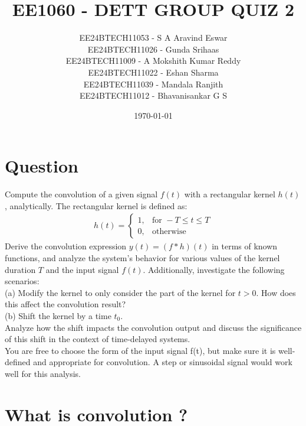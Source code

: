 \documentclass[12pt]{article}
\title{\textbf{EE1060 - DETT GROUP QUIZ 2}}
\author{EE24BTECH11053 - S A Aravind Eswar \\ EE24BTECH11026 - Gunda Srihaas \\ EE24BTECH11009 - A Mokshith Kumar Reddy \\ EE24BTECH11022 - Eshan Sharma \\ EE24BTECH11039 - Mandala Ranjith \\ EE24BTECH11012 - Bhavanisankar G S}
\date{\today}
\begin{document}
\maketitle
\thispagestyle{empty} %

\newpage
\tableofcontents
\newpage


\section{\textbf{Question}}

Compute the convolution of a given signal $f(t)$ with a rectangular kernel $h(t)$, analytically. The rectangular kernel
is defined as:
\begin{align}
h(t) =
\begin{cases}
1, & \text{for } -T \leq t \leq T \\
0, & \text{otherwise}
\end{cases} \label{eq:kernelq}
\end{align}
Derive the convolution expression $y(t) = (f * h)(t)$ in terms of known functions, and analyze the system’s behavior
for various values of the kernel duration $T$ and the input signal $f(t)$. Additionally, investigate the following scenarios:\\
(a) Modify the kernel to only consider the part of the kernel for $t > 0$. How does this affect the convolution result? \\
(b) Shift the kernel by a time $t_0$. \\
Analyze how the shift impacts the convolution output and discuss the significance
of this shift in the context of time-delayed systems. \\
You are free to choose the form of the input signal f(t), but make sure it is well-defined and appropriate for
convolution. A step or sinusoidal signal would work well for this analysis.

\section{\textbf{What is convolution ?}}
\end{document}
